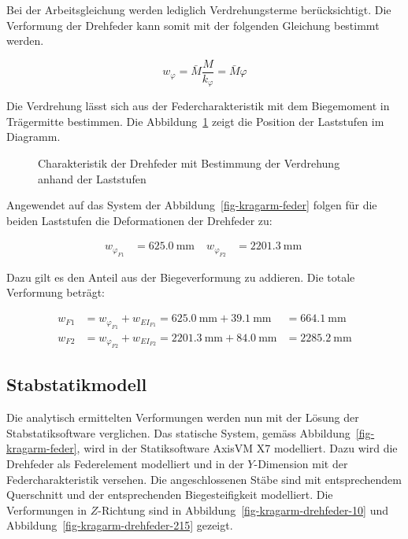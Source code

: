 \documentclass[
  11pt,
  letterpaper,
]{scrreprt}
\begin{document}
Bei der Arbeitsgleichung werden lediglich Verdrehungsterme
berücksichtigt. Die Verformung der Drehfeder kann somit mit der
folgenden Gleichung bestimmt werden.

\[
w_{\varphi} = \bar{M} \frac{M}{k_\varphi} = \bar{M} \varphi
\]

Die Verdrehung lässt sich aus der Federcharakteristik mit dem
Biegemoment in Trägermitte bestimmen. Die
Abbildung~\ref{fig-feder-force} zeigt die Position der Laststufen im
Diagramm.

\begin{figure}[H]


\caption{\label{fig-feder-force}Charakteristik der Drehfeder mit
Bestimmung der Verdrehung anhand der Laststufen}

\end{figure}%

Angewendet auf das System der Abbildung~\ref{fig-kragarm-feder} folgen
für die beiden Laststufen die Deformationen der Drehfeder zu:

$$
\begin{aligned}
w_{\varphi_{F1}} &= 625.0\ \mathrm{mm} \; 
 &w_{\varphi_{F2}} &= 2201.3\ \mathrm{mm} \;
\end{aligned}
$$

Dazu gilt es den Anteil aus der Biegeverformung zu addieren. Die totale
Verformung beträgt:

$$
\begin{aligned}
w_{F1} &= w_{\varphi_{F1}} + w_{EI_{F1}}  = 625.0\ \mathrm{mm} + 39.1\ \mathrm{mm} &= 664.1\ \mathrm{mm}  
\\[11pt]
w_{F2} &= w_{\varphi_{F2}} + w_{EI_{F2}}  = 2201.3\ \mathrm{mm} + 84.0\ \mathrm{mm} &= 2285.2\ \mathrm{mm}  
\end{aligned}
$$

\subsection{Stabstatikmodell}\label{stabstatikmodell}

Die analytisch ermittelten Verformungen werden nun mit der Lösung der
Stabstatiksoftware verglichen. Das statische System, gemäss
Abbildung~\ref{fig-kragarm-feder}, wird in der Statiksoftware AxisVM X7
modelliert. Dazu wird die Drehfeder als Federelement modelliert und in
der \(Y\)-Dimension mit der Federcharakteristik versehen. Die
angeschlossenen Stäbe sind mit entsprechendem Querschnitt und der
entsprechenden Biegesteifigkeit modelliert. Die Verformungen in
\(Z\)-Richtung sind in Abbildung~\ref{fig-kragarm-drehfeder-10} und
Abbildung~\ref{fig-kragarm-drehfeder-215} gezeigt.
\end{document}
